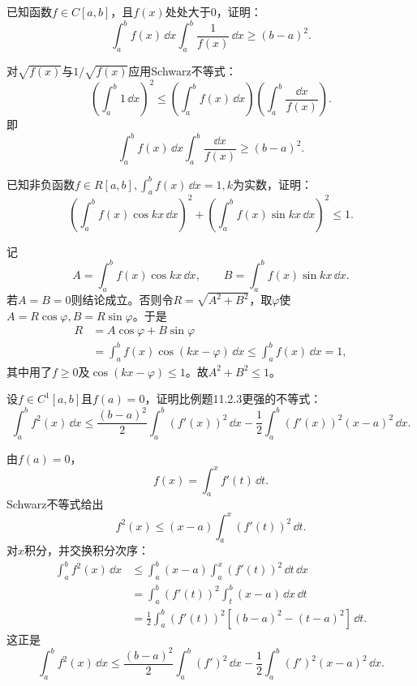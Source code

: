 \begin{xexercise}[6]
已知函数$f\in C[a,b]$，且$f(x)$处处大于0，证明：
  \[
    \int_a^bf(x)\,\dd x\int_a^b\frac1{f(x)}\,\dd x\ge(b-a)^2.
  \]
\end{xexercise}
\begin{xsolution}
对$\sqrt{f(x)}$与$1/\sqrt{f(x)}$应用Schwarz不等式：
\[
 \left(\int_a^b1\,\dd x\right)^2
 \le\left(\int_a^bf(x)\,\dd x\right)
 \left(\int_a^b\frac{\dd x}{f(x)}\right).
\]
即
\[
 \int_a^bf(x)\,\dd x\int_a^b\frac{\dd x}{f(x)}\ge(b-a)^2.
\]
\end{xsolution}


\begin{xexercise}[7]
已知非负函数$f\in R[a,b],\int_a^bf(x)\,\dd x=1,k$为实数，证明：
  \[
    \left(\int_a^bf(x)\cos kx\,\dd x\right)^2+
    \left(\int_a^bf(x)\sin kx\,\dd x\right)^2\le1.
  \]
\end{xexercise}
\begin{xsolution}
记
\[
 A=\int_a^bf(x)\cos kx\,\dd x,\qquad
 B=\int_a^bf(x)\sin kx\,\dd x.
\]
若$A=B=0$则结论成立。否则令$R=\sqrt{A^2+B^2}$，取$\varphi$使$A=R\cos\varphi,B=R\sin\varphi$。于是
\begin{align*}
R&=A\cos\varphi+B\sin\varphi\\
&=\int_a^bf(x)\cos(kx-\varphi)\,\dd x
\le\int_a^bf(x)\,\dd x=1,
\end{align*}
其中用了$f\ge0$及$\cos(kx-\varphi)\le1$。故$A^2+B^2\le1$。
\end{xsolution}


\begin{xexercise}[8]
设$f\in C^1[a,b]$且$f(a)=0$，证明比例题11.2.3更强的不等式：
  \[
    \int_a^bf^2(x)\,\dd x\le\frac{(b-a)^2}{2}\int_a^b(f'(x))^2\,\dd x
    -\frac12\int_a^b(f'(x))^2(x-a)^2\,\dd x.
  \]
\end{xexercise}
\begin{xsolution}
由$f(a)=0$，
\[
 f(x)=\int_a^xf'(t)\,\dd t.
\]
Schwarz不等式给出
\[
 f^2(x)\le(x-a)\int_a^x(f'(t))^2\,\dd t.
\]
对$x$积分，并交换积分次序：
\begin{align*}
\int_a^bf^2(x)\,\dd x
&\le\int_a^b(x-a)\int_a^x(f'(t))^2\,\dd t\,\dd x\\
&=\int_a^b(f'(t))^2\int_t^b(x-a)\,\dd x\,\dd t\\
&=\frac12\int_a^b(f'(t))^2\left[(b-a)^2-(t-a)^2\right]\,\dd t.
\end{align*}
这正是
\[
 \int_a^bf^2(x)\,\dd x
 \le\frac{(b-a)^2}{2}\int_a^b(f')^2\,\dd x
 -\frac12\int_a^b(f')^2(x-a)^2\,\dd x.
\]
\end{xsolution}


